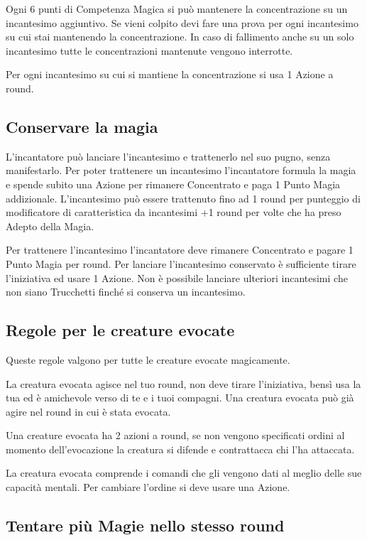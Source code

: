 \begin{multicols}{2}
Ogni 6 punti di Competenza Magica si può mantenere la concentrazione su un incantesimo aggiuntivo. Se vieni colpito devi fare una prova per ogni incantesimo su cui stai mantenendo la concentrazione. In caso di fallimento anche su un solo incantesimo tutte le concentrazioni mantenute vengono interrotte.

Per ogni incantesimo su cui si mantiene la concentrazione si usa 1 Azione a round.

\subsection{Conservare la magia}\label{magieconservare}

L'incantatore può lanciare l'incantesimo e trattenerlo nel suo pugno, senza manifestarlo. Per poter trattenere un incantesimo l'incantatore formula la magia e spende subito una Azione per rimanere Concentrato e paga 1 Punto Magia addizionale.
L'incantesimo può essere trattenuto fino ad 1 round per punteggio di modificatore di caratteristica da incantesimi +1 round per volte che ha preso Adepto della Magia.

Per trattenere l'incantesimo l'incantatore deve rimanere Concentrato e pagare 1 Punto Magia per round.
Per lanciare l'incantesimo conservato è sufficiente tirare l'iniziativa ed usare 1 Azione. Non è possibile lanciare ulteriori incantesimi che non siano Trucchetti finché si conserva un incantesimo.

\subsection{Regole per le creature evocate}

Queste regole valgono per tutte le creature evocate magicamente.

La creatura evocata agisce nel tuo round, non deve tirare l'iniziativa, bensì usa la tua ed è amichevole verso di te e i tuoi compagni. Una creatura evocata può già agire nel round in cui è stata evocata.

Una creature evocata ha 2 azioni a round, se non vengono specificati ordini al momento dell'evocazione la creatura si difende e contrattacca chi l'ha attaccata.

La creatura evocata comprende i comandi che gli vengono dati al meglio delle sue capacità mentali. Per cambiare l'ordine si deve usare una Azione.

\subsection{Tentare più Magie nello stesso round}\hypertarget{piumagieround}{}\label{piumagieround}


\end{multicols}
